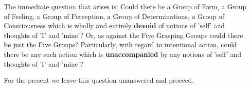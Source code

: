 The immediate question that arises is: Could there be a Group of Form, a
Group of Feeling, a Group of Perception, a Group of Determinations, a
Group of Consciousness which is wholly and entirely \textbf{devoid} of notions
of 'self' and thoughts of 'I' and 'mine'? Or, as against the Five
Grasping Groups could there be just the Five Groups? Particularly, with
regard to intentional action, could there be any such action which is
\textbf{unaccompanied} by any notions of 'self' and thoughts of 'I' and 'mine'?


For the present we leave this question unanswered and proceed.


